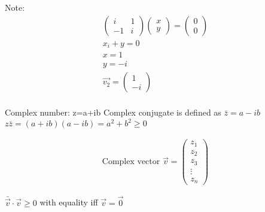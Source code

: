 Note:
\begin{equation*}
  \begin{array}{l}
    \begin{pmatrix}
        i & 1 \\
        -1 & i
    \end{pmatrix}
    \begin{pmatrix}
        x \\
        y
    \end{pmatrix}
    =
    \begin{pmatrix}
        0 \\
        0
    \end{pmatrix}\\
    x_{i}+y =0 \\
    x=1\\
    y=-i\\
    \Vec{v_{2}} =
    \begin{pmatrix}
      1 \\
      -i
    \end{pmatrix}\\
  \end{array}
\end{equation*}

Complex number: z=a+ib
Complex conjugate is defined as $\bar{z}=a-ib$
$z\bar{z} = (a+ib)(a-ib) = a^2 + b^2 \geq 0$

\begin{equation*}
  \begin{array}{l}
  \text{Complex vector  } \Vec{v}=
    \begin{pmatrix}
        z_{1} \\
        z_{2} \\
        z_{3} \\
        \vdots \\
        z_{n}
    \end{pmatrix}
  \end{array}
\end{equation*}

\begin{center}
    $\bar{\Vec{v}} \cdot \Vec{v} \geq 0$ with equality iff $\Vec{v} = \Vec{0}$
\end{center}
\vspace{20px}